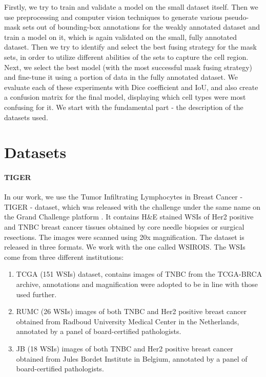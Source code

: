 Firstly, we try to train and validate a model on the small dataset itself. Then we use preprocessing and computer vision techniques to generate various pseudo-mask sets out of bounding-box annotations for the weakly annotated dataset and train a model on it, which is again validated on the small, fully annotated dataset. Then we try to identify and select the best fusing strategy for the mask sets, in order to utilize different abilities of the sets to capture the cell region. Next, we select the best model (with the most successful mask fusing strategy) and fine-tune it using a portion of data in the fully annotated dataset. We evaluate each of these experiments with Dice coefficient and IoU, and also create a confusion matrix for the final model, displaying which cell types were most confusing for it. We start with the fundamental part - the description of the datasets used.

\section{Datasets}
\label{sec:datasets}

\paragraph{TIGER} In our work, we use the Tumor Infiltrating Lymphocytes in Breast Cancer - TIGER - dataset, which was released with the challenge under the same name on the Grand Challenge platform \cite{tiger_dataset}. It contains H\&E stained WSIs of Her2 positive and TNBC breast cancer tissues obtained by core needle biopsies or surgical resections. The images were scanned using 20x magnification. The dataset is released in three formats. We work with the one called WSIROIS. The WSIs come from three different institutions:

\begin{enumerate}
    \item TCGA (151 WSIs) dataset, contains images of TNBC from the TCGA-BRCA archive, annotations and magnification were adopted to be in line with those used further.
    \item RUMC (26 WSIs) images of both TNBC and Her2 positive breast cancer obtained from Radboud University Medical Center in the Netherlands, annotated by a panel of board-certified pathologists.
    \item JB (18 WSIs) images of both TNBC and Her2 positive breast cancer obtained from Jules Bordet Institute in Belgium, annotated by a panel of board-certified pathologists.
\end{enumerate}

